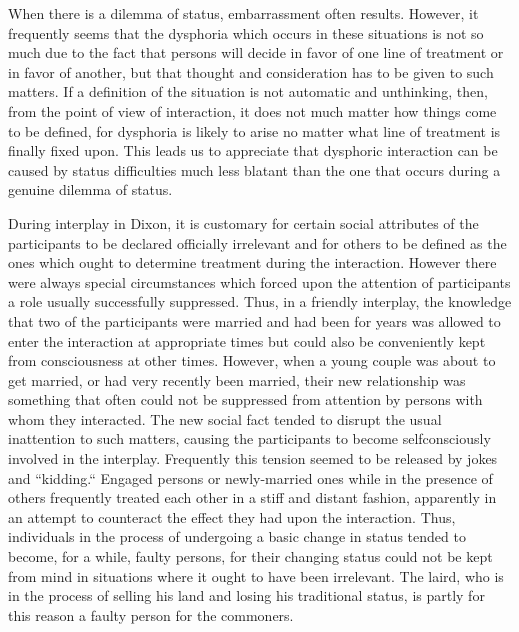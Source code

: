 \documentclass[twoside,symmetric,nobib,justified]{tufte-book}
\begin{document}
When there is a dilemma of status, embarrassment often results. However,
it frequently seems that the dysphoria which occurs in these situations
is not so much due to the fact that persons will decide in favor of one
line of treatment or in favor of another, but that thought and
consideration has to be given to such matters. If a definition of the
situation is not automatic and unthinking, then, from the point of view
of interaction, it does not much matter how things come to be defined,
for dysphoria is likely to arise no matter what line of treatment is
finally fixed upon. This leads us to appreciate that dysphoric
interaction can be caused by status difficulties much less blatant than
the one that occurs during a genuine dilemma of status.

During interplay in Dixon, it is customary for certain social attributes
of the participants to be declared officially irrelevant and for others
to be defined as the ones which ought to determine treatment during the
interaction. However there were always special circumstances which
forced upon the attention of participants a role usually successfully
suppressed. Thus, in a friendly interplay, the knowledge that two of the
participants were married and had been for years was allowed to enter
the interaction at appropriate times but could also be conveniently kept
from consciousness at other times. However, when a young couple was
about to get married, or had very recently been married, their new
relationship was something that often could not be suppressed from
attention by persons with whom they interacted. The new social fact
tended to disrupt the usual inattention to such matters, causing the
participants to become selfconsciously involved in the interplay.
Frequently this tension seemed to be released by jokes and ``kidding.``
Engaged persons or newly-married ones while in the presence of others
frequently treated each other in a stiff and distant fashion, apparently
in an attempt to counteract the effect they had upon the interaction.
Thus, individuals in the process of undergoing a basic change in status
tended to become, for a while, faulty persons, for their changing status
could not be kept from mind in situations where it ought to have been
irrelevant. The laird, who is in the process of selling his land and
losing his traditional status, is partly for this reason a faulty person
for the commoners.
\end{document}
